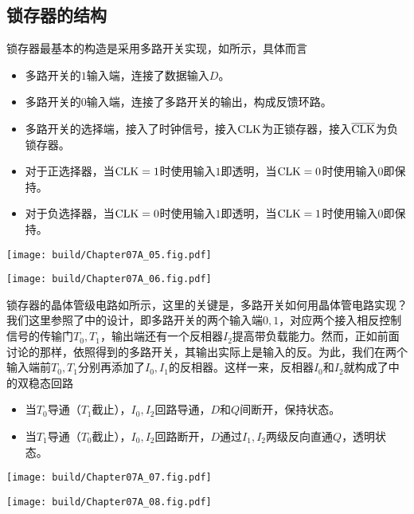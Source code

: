 \subsection{锁存器的结构}
锁存器最基本的构造是采用多路开关实现，如所示，具体而言
\begin{itemize}
    \item 多路开关的$1$输入端，连接了数据输入$D$。
    \item 多路开关的$0$输入端，连接了多路开关的输出，构成反馈环路。
    \item 多路开关的选择端，接入了时钟信号，接入$\CLK$为正锁存器，接入$\CLK*$为负锁存器。
    \item 对于正选择器，当$\CLK=1$时使用输入$1$即透明，当$\CLK=0$时使用输入$0$即保持。
    \item 对于负选择器，当$\CLK=0$时使用输入$1$即透明，当$\CLK=1$时使用输入$0$即保持。
\end{itemize}

\begin{Figure}[锁存器]
    \begin{FigureSub}
        \texttt{[image: build/Chapter07A\_05.fig.pdf]}
    \end{FigureSub}
    \hspace{0.5cm}
    \begin{FigureSub}
        \texttt{[image: build/Chapter07A\_06.fig.pdf]}
    \end{FigureSub}
\end{Figure}

锁存器的晶体管级电路如所示，这里的关键是，多路开关如何用晶体管电路实现？我们这里参照了中的设计，即多路开关的两个输入端$0,1$，对应两个接入相反控制信号的传输门$T_0,T_1$，输出端还有一个反相器$I_2$提高带负载能力。然而，正如前面讨论的那样，依照得到的多路开关，其输出实际上是输入的反。为此，我们在两个输入端前$T_0,T_1$分别再添加了$I_0,I_1$的反相器。这样一来，反相器$I_0$和$I_2$就构成了中的双稳态回路
\begin{itemize}
    \item 当$T_0$导通（$T_1$截止），$I_0,I_2$回路导通，$D$和$Q$间断开，保持状态。
    \item 当$T_1$导通（$T_0$截止），$I_0,I_2$回路断开，$D$通过$I_1,I_2$两级反向直通$Q$，透明状态。
\end{itemize}

\begin{Figure}[锁存器的电路]
    \begin{FigureSub}
        \texttt{[image: build/Chapter07A\_07.fig.pdf]}
    \end{FigureSub}
    \hspace{0.1cm}
    \begin{FigureSub}
        \texttt{[image: build/Chapter07A\_08.fig.pdf]}
    \end{FigureSub}
\end{Figure}\goodbreak

